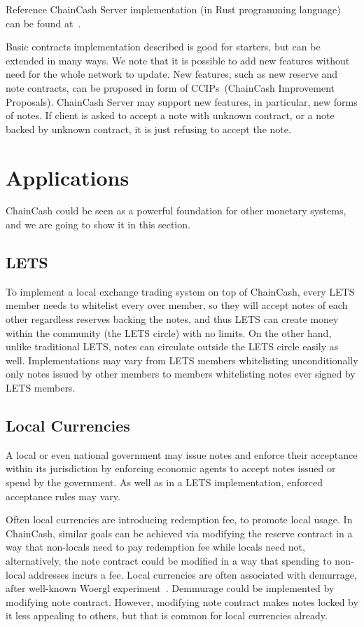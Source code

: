 \documentclass{article}   %
\newcommand{\cc}{ChainCash}
\begin{document}
Reference \cc{} Server implementation (in Rust programming language) can be found at~\cite{server}.

Basic contracts implementation described is good for starters, but can be extended in many ways.  We note that it is possible
to add new features without need for the whole network to update. New features, such as new reserve and note contracts,
can be proposed in form of CCIPs~(ChainCash Improvement Proposals). ChainCash
Server may support new features, in particular, new forms of notes. If client is asked to accept a note with unknown
contract, or a note backed by unknown contract, it is just refusing to accept the note.

\section{Applications}
\label{sec-apps}

\cc{} could be seen as a powerful foundation for other monetary systems, and we are going to show it in this section. 

\subsection{LETS}

To implement a local exchange trading system on top of \cc{}, every LETS member needs to whitelist every over member, so they will accept notes of each other regardless reserves backing the notes, and thus LETS can create money within the community (the LETS circle) with no limits. On the other hand, unlike traditional LETS, notes can circulate outside the LETS circle easily as well. Implementations may vary from LETS members whitelisting unconditionally only notes issued by other members to members whitelisting notes ever signed by LETS members. 


\subsection{Local Currencies}

A local or even national government may issue notes and enforce their acceptance within its jurisdiction by enforcing economic agents to accept notes issued or spend by the government. As well as in a LETS implementation, enforced acceptance rules may vary. 

Often local currencies are introducing redemption fee, to promote local usage. In \cc{}, similar goals can be achieved via modifying the reserve contract in a way that non-locals need to pay redemption fee while locals need not, alternatively, the note contract could be modified in a way that spending to non-local addresses incurs a fee. Local currencies are often associated with demurrage, after well-known Woergl experiment~\cite{unterguggenbercer1934end}. Demmurage could be implemented by modifying note contract. However, modifying note contract makes notes locked by it less appealing to others, but that is common for local currencies already.
\end{document}
